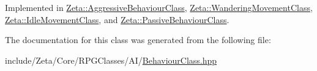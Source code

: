 Implemented in \hyperlink{classZeta_1_1AggressiveBehaviourClass_a94e8ce28a8c07370b144ac050f447823}{Zeta\+::\+Aggressive\+Behaviour\+Class}, \hyperlink{classZeta_1_1WanderingMovementClass_a3b2cfba3c84bd5cdd892c09d8fd8a0fd}{Zeta\+::\+Wandering\+Movement\+Class}, \hyperlink{classZeta_1_1IdleMovementClass_a4ba32888d1561f7b5820d2620e7762e9}{Zeta\+::\+Idle\+Movement\+Class}, and \hyperlink{classZeta_1_1PassiveBehaviourClass_a1923b88aff0a6ec1e902f8820c6e4c3f}{Zeta\+::\+Passive\+Behaviour\+Class}.



The documentation for this class was generated from the following file\+:\begin{DoxyCompactItemize}
\item 
include/\+Zeta/\+Core/\+R\+P\+G\+Classes/\+A\+I/\hyperlink{BehaviourClass_8hpp}{Behaviour\+Class.\+hpp}\end{DoxyCompactItemize}
